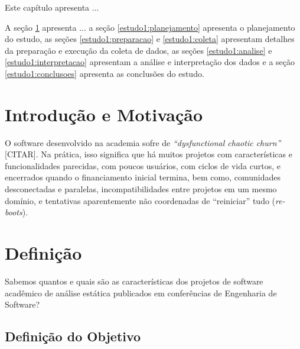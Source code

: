 {Este capítulo apresenta ...}

A seção \ref{estudo1:introducao} apresenta ...
a seção \ref{estudo1:planejamento} apresenta o planejamento do estudo,
as seções \ref{estudo1:preparacao} e \ref{estudo1:coleta} apresentam detalhes da preparação e execução da coleta de dados,
as seções \ref{estudo1:analise} e \ref{estudo1:interpretacao} apresentam a análise e interpretação dos dados e
a seção \ref{estudo1:conclusoes} apresenta as conclusões do estudo.


\section{Introdução e Motivação} \label{estudo1:introducao}

O software desenvolvido na academia sofre de {\it ``dysfunctional chaotic churn''} [CITAR].
Na prática, isso significa que há muitos projetos com características e funcionalidades parecidas, 
com poucos usuários, com ciclos de vida curtos, e encerrados quando o financiamento inicial termina,
bem como, comunidades desconectadas e paralelas, incompatibilidades entre projetos em um mesmo domínio, 
e tentativas aparentemente não coordenadas de ``reiniciar'' tudo ({\it re-boots}).

\section{Definição} \label{estudo1:definicao} %


Sabemos quantos e quais são as características dos projetos de software
acadêmico de análise estática publicados em conferências de Engenharia de
Software?

\subsection{Definição do Objetivo}

